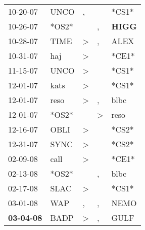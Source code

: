 \begin{supertabular}{p{0.07\textwidth}p{0.06\textwidth}p{0.02\textwidth}p{0.02\textwidth}p{0.06\textwidth}}
          10-20-07\textsuperscript{} &           UNCO\textsuperscript{} &                , &               &                            *CS1* \\
          10-26-07\textsuperscript{} &                            *OS2* &                  &             , &  \textbf{HIGG\textsuperscript{}} \\
          10-28-07\textsuperscript{} &           TIME\textsuperscript{} &     \textgreater &             , &           ALEX\textsuperscript{} \\
          10-31-07\textsuperscript{} &            haj\textsuperscript{} &     \textgreater &               &                            *CE1* \\
          11-15-07\textsuperscript{} &           UNCO\textsuperscript{} &     \textgreater &               &                            *CS1* \\
          12-01-07\textsuperscript{} &           kats\textsuperscript{} &     \textgreater &               &                            *CS1* \\
          12-01-07\textsuperscript{} &           reso\textsuperscript{} &     \textgreater &             , &           blbc\textsuperscript{} \\
          12-01-07\textsuperscript{} &                            *OS2* &                  &  \textgreater &           reso\textsuperscript{} \\
          12-16-07\textsuperscript{} &           OBLI\textsuperscript{} &     \textgreater &               &                            *CS2* \\
          12-31-07\textsuperscript{} &           SYNC\textsuperscript{} &     \textgreater &               &                            *CS2* \\
          02-09-08\textsuperscript{} &           call\textsuperscript{} &     \textgreater &               &                            *CE1* \\
          02-13-08\textsuperscript{} &                            *OS2* &                  &             , &           blbc\textsuperscript{} \\
          02-17-08\textsuperscript{} &           SLAC\textsuperscript{} &     \textgreater &               &                            *CS1* \\
          03-01-08\textsuperscript{} &            WAP\textsuperscript{} &                , &             , &           NEMO\textsuperscript{} \\
 \textbf{03-04-08\textsuperscript{}} &           BADP\textsuperscript{} &     \textgreater &             , &           GULF\textsuperscript{} \\

\end{supertabular}

